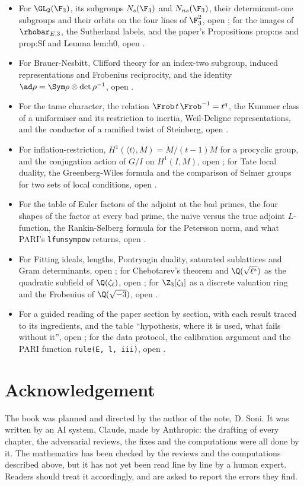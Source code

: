 \begin{itemize}
congruence criterion and oldform lemma of the paper, open .
\item For $\GL_2(\F_3)$, its subgroups $N_s(\F_3)$ and $N_{ns}(\F_3)$, their determinant-one
subgroups and their orbits on the four lines of $\F_3^2$, open ; for the images of
$\rhobar_{E,3}$, the Sutherland labels, and the paper's Propositions prop:ns and prop:Sf and Lemma
lem:h0, open .
\item For Brauer-Nesbitt, Clifford theory for an index-two subgroup, induced representations and
Frobenius reciprocity, and the identity $\ad\rho=\Sym\rho\otimes\det\rho^{-1}$, open
.
\item For the tame character, the relation $\Frob\,t\,\Frob^{-1}=t^{q}$, the Kummer class of a
uniformiser and its restriction to inertia, Weil-Deligne representations, and the conductor of a
ramified twist of Steinberg, open .
\item For inflation-restriction, $H^1(\langle t\rangle,M)=M/(t-1)M$ for a procyclic group, and the
conjugation action of $G/I$ on $H^1(I,M)$, open ; for Tate local duality, the
Greenberg-Wiles formula and the comparison of Selmer groups for two sets of local conditions, open
.
\item For the table of Euler factors of the adjoint at the bad primes, the four shapes of the
factor at every bad prime, the naive versus the true adjoint $L$-function, the Rankin-Selberg
formula for the Petersson norm, and what PARI's \texttt{lfunsympow} returns, open
.
\item For Fitting ideals, lengths, Pontryagin duality, saturated sublattices and Gram
determinants, open ; for Chebotarev's theorem and $\Q(\sqrt{\ell^*})$ as the
quadratic subfield of $\Q(\zeta_\ell)$, open ; for $\Z_3[\zeta_3]$ as a discrete
valuation ring and the Frobenius of $\Q(\sqrt{-3})$, open .
\item For a guided reading of the paper section by section, with each result traced to its
ingredients, and the table ``hypothesis, where it is used, what fails without it'', open
; for the data protocol, the calibration argument and the PARI function
\texttt{rule(E, l, iii)}, open .
\end{itemize}

\section*{Acknowledgement}

The book was planned and directed by the author of the note, D. Soni. It was written by an AI system,
Claude, made by Anthropic: the drafting of every chapter, the adversarial reviews, the fixes and
the computations were all done by it. The mathematics has been checked by the reviews and the
computations described above, but it has not yet been read line by line by a human expert.
Readers should treat it accordingly, and are asked to report the errors they find.
